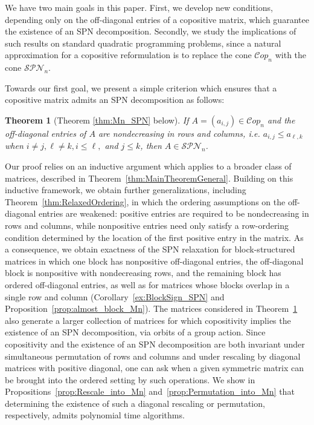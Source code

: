 \documentclass{amsart}
\newcommand{\Cop}{\mathcal{C}op}
\newcommand{\SPN}{\mathcal{SPN}}
\newtheorem{theorem}{Theorem}[section]
\theoremstyle{definition}
\begin{document}
We have two main goals in this paper. First, we develop new conditions, depending only on the off-diagonal entries of a copositive matrix, which guarantee the existence of an SPN decomposition. Secondly, we study the implications of such results on standard quadratic programming problems, since a natural approximation for a copositive reformulation is to replace the cone $\Cop_n$ with the cone $\SPN_n$.

Towards our first goal, we present a simple criterion which ensures that a copositive matrix admits an SPN decomposition as follows:
\begin{theorem}[Theorem \ref{thm:Mn_SPN} below]\label{thm:OrderedEntries_Intro}
If $A = (a_{i,j})\in \Cop_n$ and the off-diagonal entries of $A$ are nondecreasing in rows and columns, i.e. $a_{i,j} \leq a_{\ell,k}$ when $i\neq j, \ell\neq k,i \leq \ell,$ and $j \leq k$, then $A \in \SPN_n$.
\end{theorem}
%
Our proof relies on an inductive argument which applies to a broader class of matrices, described in Theorem~\ref{thm:MainTheoremGeneral}. Building on this inductive framework, we obtain further generalizations, including Theorem~\ref{thm:RelaxedOrdering}, in which the ordering assumptions on the off-diagonal entries are weakened: positive entries are required to be nondecreasing in rows and columns, while nonpositive entries need only satisfy a row-ordering condition determined by the location of the first positive entry in the matrix. As a consequence, we obtain exactness of the SPN relaxation for block-structured matrices in which one block has nonpositive off-diagonal entries, the off-diagonal block is nonpositive with nondecreasing rows, and the remaining block has ordered off-diagonal entries, as well as for matrices whose blocks overlap in a single row and column (Corollary~\ref{ex:BlockSign_SPN} and Proposition~\ref{prop:almost_block_Mn}). The matrices considered in Theorem~\ref{thm:OrderedEntries_Intro} also generate a larger collection of matrices for which copositivity implies the existence of an SPN decomposition, via orbits of a group action. Since copositivity and the existence of an SPN decomposition are both invariant under simultaneous permutation of rows and columns and under rescaling by diagonal matrices with positive diagonal, one can ask when a given symmetric matrix can be brought into the ordered setting by such operations. We show in Propositions~\ref{prop:Rescale_into_Mn} and~\ref{prop:Permutation_into_Mn} that determining the existence of such a diagonal rescaling or permutation, respectively, admits polynomial time algorithms.
\end{document}
